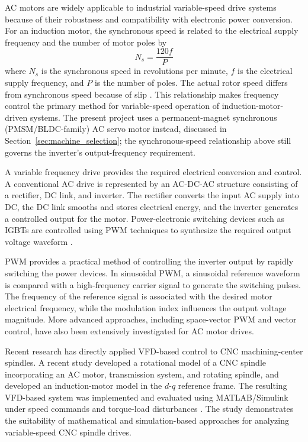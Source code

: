 \documentclass[12pt,a4paper]{report}
\begin{document}
	AC motors are widely applicable to industrial variable-speed drive systems because of their robustness and compatibility with electronic power conversion. For an induction motor, the synchronous speed is related to the electrical supply frequency and the number of motor poles by
	\begin{equation}
		N_s=\frac{120f}{P}
	\end{equation}
	where $N_s$ is the synchronous speed in revolutions per minute, $f$ is the electrical supply frequency, and $P$ is the number of poles. The actual rotor speed differs from synchronous speed because of slip \cite{ref4,ref5,ref6}. This relationship makes frequency control the primary method for variable-speed operation of induction-motor-driven systems. The present project uses a permanent-magnet synchronous (PMSM/BLDC-family) AC servo motor instead, discussed in Section~\ref{sec:machine_selection}; the synchronous-speed relationship above still governs the inverter's output-frequency requirement.
	
	A variable frequency drive provides the required electrical conversion and control. A conventional AC drive is represented by an AC-DC-AC structure consisting of a rectifier, DC link, and inverter. The rectifier converts the input AC supply into DC, the DC link smooths and stores electrical energy, and the inverter generates a controlled output for the motor. Power-electronic switching devices such as IGBTs are controlled using PWM techniques to synthesize the required output voltage waveform \cite{ref7,ref8}.
	
	PWM provides a practical method of controlling the inverter output by rapidly switching the power devices. In sinusoidal PWM, a sinusoidal reference waveform is compared with a high-frequency carrier signal to generate the switching pulses. The frequency of the reference signal is associated with the desired motor electrical frequency, while the modulation index influences the output voltage magnitude. More advanced approaches, including space-vector PWM and vector control, have also been extensively investigated for AC motor drives.
	
	Recent research has directly applied VFD-based control to CNC machining-center spindles. A recent study developed a rotational model of a CNC spindle incorporating an AC motor, transmission system, and rotating spindle, and developed an induction-motor model in the $d$-$q$ reference frame. The resulting VFD-based system was implemented and evaluated using MATLAB/Simulink under speed commands and torque-load disturbances \cite{ref13}. The study demonstrates the suitability of mathematical and simulation-based approaches for analyzing variable-speed CNC spindle drives.
	
\end{document}
